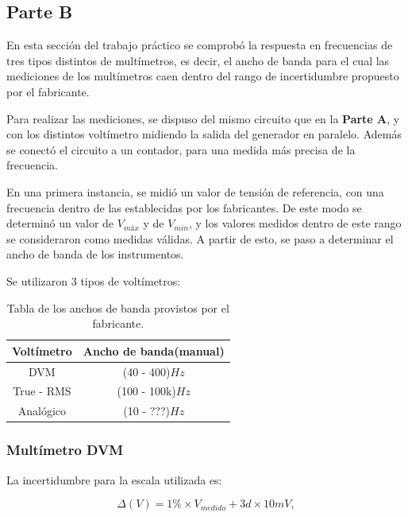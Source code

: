 \documentclass{article}
\begin{document}
\subsection{Parte B}

En esta sección del trabajo práctico se comprobó la respuesta en frecuencias de tres tipos distintos de multímetros, es decir, el ancho de banda para el cual las mediciones de los multímetros caen dentro del rango de incertidumbre propuesto por el fabricante.


Para realizar las mediciones, se dispuso del mismo circuito que en la \textbf{Parte A}, y con los distintos voltímetro midiendo la salida del generador en paralelo. Además se conectó el circuito a un contador, para una medida más precisa de la frecuencia.

En una primera instancia, se midió un valor de tensión de referencia, con una frecuencia dentro de las establecidas por los fabricantes. De este modo se determinó un valor de \textbf{$V_{máx}$} y de \textbf{$V_{min}$}, y los valores medidos dentro de este rango se consideraron como medidas válidas. A partir de esto, se paso a determinar el ancho de banda de los instrumentos.
\bigskip

Se utilizaron 3 tipos de voltímetros:
\bigskip

\begin{table}[!hbt]
	\begin{center}
	\begin{tabular}{|c|c|}\hline
	\textbf{Voltímetro} & \textbf{Ancho de banda(manual)}\\ \hline
    DVM &  (40 - 400)$Hz$\\ \hline
    True - RMS &  (100 - 100k)$Hz$\\ \hline
    Analógico &  (10 - ???)$Hz$\\ \hline
	\end{tabular}
	\caption{Tabla de los anchos de banda provistos por el fabricante.}
	\end{center}
\end{table}

\subsubsection{Multímetro DVM}

La incertidumbre para la escala utilizada es:

\begin{equation}
 	\Delta(V) = 1\%\times V_{medido} + 3d\times 10mV,
\end{equation}
\medskip
\end{document}

